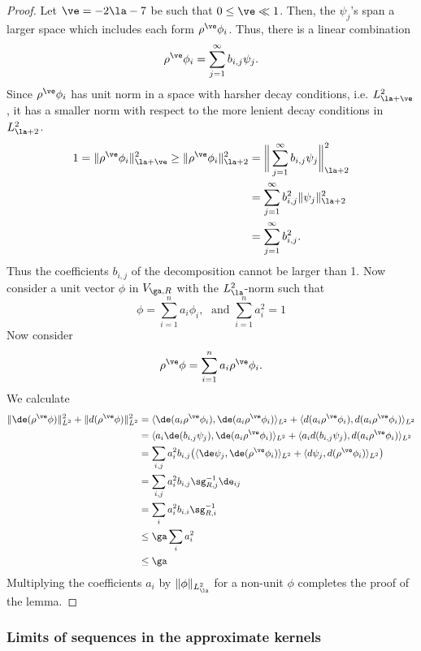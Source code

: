 \documentclass[hidelinks, 12pt, oneside, reqno]{amsart}
\begin{document}
\begin{proof}
    Let $\ve = -2\la - 7$ be such that $0 \le \ve \ll 1$. Then, the $\psi_j$'s span a larger space which includes each form $\rho^{\ve} \phi_i$. Thus, there is a linear combination 
    \[
    \rho^\ve \phi_i = \sum_{j=1}^\infty b_{i,j} \psi_j.
    \]
    Since $\rho^{\ve} \phi_i$ has unit norm in a space with harsher decay conditions, i.e. $L^2_{\la + \ve}$, it has a smaller norm with respect to the more lenient decay conditions in $L^2_{\la + 2}$.
    \begin{align*}
        1 = \|\rho^{\ve} \phi_i\|_{\la + \ve}^2 \ge \|\rho^\ve \phi_i\|_{\la + 2}^2
        &= \bigg\|\sum_{j=1}^\infty b_{i,j} \psi_j\bigg\|_{\la+2}^2 \\
        &= \sum_{j=1}^\infty b_{i,j}^2 \|\psi_j\|_{\la+2}^2 \\
        &= \sum_{j=1}^\infty b_{i,j}^2.
    \end{align*}
    Thus the coefficients $b_{i,j}$ of the decomposition cannot be larger than 1. Now consider a unit vector $\phi$ in $V_{\ga,R}$ with the $L^2_\la$-norm such that
    \[
    \phi = \sum_{i=1}^n a_i \phi_i, \;\text{ and } \sum_{i=1}^n a_i^2 = 1
    \]
    Now consider
    \[
    \rho^\ve \phi = \sum_{i=1}^n a_i \rho^\ve \phi_i.
    \]
    We calculate
    \begin{align*}
        \|\de (\rho^\ve \phi)\|_{L^2}^2 + \|d (\rho^\ve \phi)\|_{L^2}^2 &= \langle \de (a_i \rho^\ve \phi_i) , \de (a_i \rho^\ve \phi_i) \rangle_{L^2} + \langle d (a_i \rho^\ve \phi_i) , d (a_i \rho^\ve \phi_i) \rangle_{L^2} \\
        &= \langle a_i \de (b_{i,j} \psi_j) , \de (a_i \rho^\ve \phi_i) \rangle_{L^2} + \langle a_i d (b_{i,j} \psi_j) , d (a_i \rho^\ve \phi_i) \rangle_{L^2} \\
        &= \sum_{i,j} a_i^2 b_{i,j} \big( \langle  \de \psi_j , \de (\rho^\ve \phi_i) \rangle_{L^2}  + \langle  d \psi_j , d (\rho^\ve \phi_i) \rangle_{L^2}\big) \\
        &= \sum_{i,j} a_i^2 b_{i,j} \sg_{R,j}^{-1}\de_{ij} \\
        &= \sum_{i} a_i^2 b_{i,i} \sg_{R,i}^{-1} \\
        &\le \ga \sum_{i} a_i^2  \\
        &\le \ga
    \end{align*}
    Multiplying the coefficients $a_i$ by $\|\phi\|_{L^2_{\la}}$ for a non-unit $\phi$ completes the proof of the lemma.
\end{proof}

\subsubsection{Limits of sequences in the approximate kernels}
\end{document}
